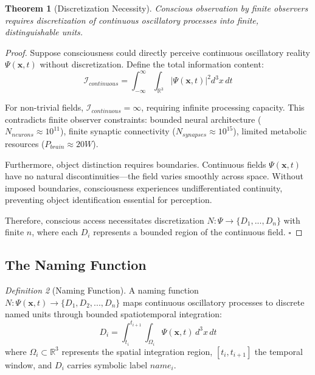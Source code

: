 \documentclass[12pt]{article}
\newtheorem{theorem}{Theorem}[section]
\theoremstyle{definition}
\newtheorem{definition}[theorem]{Definition}
\theoremstyle{remark}
\newtheorem{definition}[theorem]{Definition}
\begin{document}
\begin{theorem}[Discretization Necessity]
\label{thm:discretization_necessity}
Conscious observation by finite observers requires discretization of continuous oscillatory processes into finite, distinguishable units.
\end{theorem}

\begin{proof}
Suppose consciousness could directly perceive continuous oscillatory reality $\Psi(\mathbf{x},t)$ without discretization. Define the total information content:
\begin{equation}
\mathcal{I}_{continuous} = \int_{-\infty}^{\infty} \int_{\mathbb{R}^3} |\Psi(\mathbf{x},t)|^2 d^3x \, dt
\end{equation}

For non-trivial fields, $\mathcal{I}_{continuous} = \infty$, requiring infinite processing capacity. This contradicts finite observer constraints: bounded neural architecture ($N_{neurons} \approx 10^{11}$), finite synaptic connectivity ($N_{synapses} \approx 10^{15}$), limited metabolic resources ($P_{brain} \approx 20W$).

Furthermore, object distinction requires boundaries. Continuous fields $\Psi(\mathbf{x},t)$ have no natural discontinuities—the field varies smoothly across space. Without imposed boundaries, consciousness experiences undifferentiated continuity, preventing object identification essential for perception.

Therefore, conscious access necessitates discretization $N: \Psi \rightarrow \{D_1, ..., D_n\}$ with finite $n$, where each $D_i$ represents a bounded region of the continuous field. $\square$
\end{proof}

\subsection{The Naming Function}

\begin{definition}[Naming Function]
\label{def:naming_function}
A naming function $N: \Psi(\mathbf{x},t) \rightarrow \{D_1, D_2, ..., D_n\}$ maps continuous oscillatory processes to discrete named units through bounded spatiotemporal integration:
\begin{equation}
\label{eq:discrete_unit}
D_i = \int_{t_i}^{t_{i+1}} \int_{\Omega_i} \Psi(\mathbf{x},t) \, d^3x \, dt
\end{equation}
where $\Omega_i \subset \mathbb{R}^3$ represents the spatial integration region, $[t_i, t_{i+1}]$ the temporal window, and $D_i$ carries symbolic label $name_i$.
\end{definition}
\end{document}

